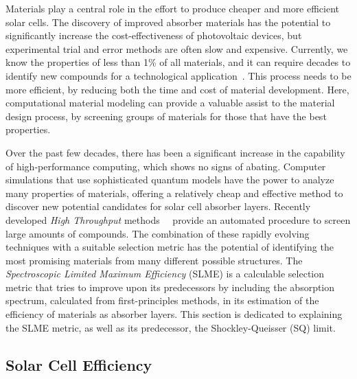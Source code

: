 \begin{refsection}
Materials play a central role in the effort to produce cheaper and more efficient solar cells. The discovery of improved absorber materials has the potential to significantly increase the cost-effectiveness of photovoltaic devices, but experimental trial and error methods are often slow and expensive. Currently, we know the properties of less than 1\% of all materials, and it can require decades to identify new compounds for a technological application~\cite{Jain2013}. This process needs to be more efficient, by reducing both the time and cost of material development. Here, computational material modeling can provide a valuable assist to the material design process, by screening groups of materials for those that have the best properties. 

Over the past few decades, there has been a significant increase in the capability of high-performance computing, which shows no signs of abating. Computer simulations that use sophisticated quantum models have the power to analyze many properties of materials, offering a relatively cheap and effective method to discover new potential candidates for solar cell absorber layers. Recently developed \textit{High Throughput} methods~\cite{Curtarolo2013}~\cite{Sarmadian2016} provide an automated procedure to screen large amounts of compounds. The combination of these rapidly evolving techniques with a suitable selection metric has the potential of identifying the most promising materials from many different possible structures. The \textit{Spectroscopic Limited Maximum Efficiency} (SLME) is a calculable selection metric that tries to improve upon its predecessors by including the absorption spectrum, calculated from first-principles methods, in its estimation of the efficiency of materials as absorber layers. This section is dedicated to explaining the SLME metric, as well as its predecessor, the Shockley-Queisser (SQ) limit. 

\subsection{Solar Cell Efficiency} \label{slme:sec-efficiency}


\end{refsection}
